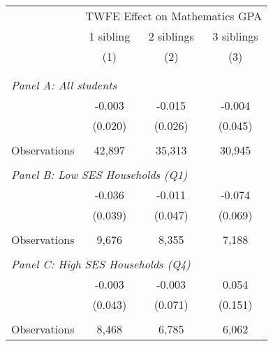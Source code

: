 \makeatletter
{}
{
\makeatother
\begin{tabular}{lccc}
\toprule
\cmidrule(lr){2-4}
& \multicolumn{3}{c}{TWFE Effect on Mathematics GPA} \\
\cmidrule(lr){2-4}
& 1 sibling & 2 siblings & 3 siblings  \\
\cmidrule(lr){2-2} \cmidrule(lr){3-3} \cmidrule(lr){4-4}
& (1) & (2) & (3)\\
\bottomrule
&  &  &  \\
&  &  &   \\
\multicolumn{4}{l}{\textit{Panel A: All students}} \\
\hspace{3mm}        &      -0.003   &      -0.015   &      -0.004   \\
                    &     (0.020)   &     (0.026)   &     (0.045)   \\
                    &               &               &               \\
\hspace{3mm}Observations&      42,897   &      35,313   &      30,945   \\
 
&  &  &   \\
\multicolumn{4}{l}{\textit{Panel B: Low SES Households (Q1)}} \\
\hspace{3mm}        &      -0.036   &      -0.011   &      -0.074   \\
                    &     (0.039)   &     (0.047)   &     (0.069)   \\
                    &               &               &               \\
\hspace{3mm}Observations&       9,676   &       8,355   &       7,188   \\
 
&  &  &   \\
\multicolumn{4}{l}{\textit{Panel C: High SES Households (Q4)}} \\
\hspace{3mm}        &      -0.003   &      -0.003   &       0.054   \\
                    &     (0.043)   &     (0.071)   &     (0.151)   \\
                    &               &               &               \\
\hspace{3mm}Observations&       8,468   &       6,785   &       6,062   \\
 

\end{tabular}}
